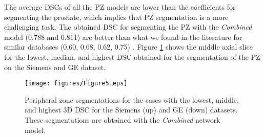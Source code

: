 The average DSCs of all the PZ models are lower than the coefficients for segmenting the prostate, which implies that PZ segmentation is a more challenging task. The obtained DSC for segmenting the PZ with the \emph{Combined} model (0.788 and 0.811) are better than what we found in the literature for similar databases (0.60, 0.68, 0.62, 0.75) \cite{mooij_automatic_2018,toth_simultaneous_2013, chilali_gland_2016, hutchison_pattern_2012}. Figure \ref{fig:ressegpz} shows the middle axial slice for the lowest, median, and highest DSC obtained for the segmentation of the PZ on the Siemens and GE dataset. 
\begin{figure}[h]
    \centering
    \texttt{[image: figures/Figure5.eps]}
    \caption{Peripheral zone segmentations for the cases with the lowest, middle, and highest 3D DSC for the Siemens (up) and GE (down) datasets. These segmentations are obtained with the \emph{Combined} network model.  }
    \label{fig:ressegpz}
\end{figure} 




